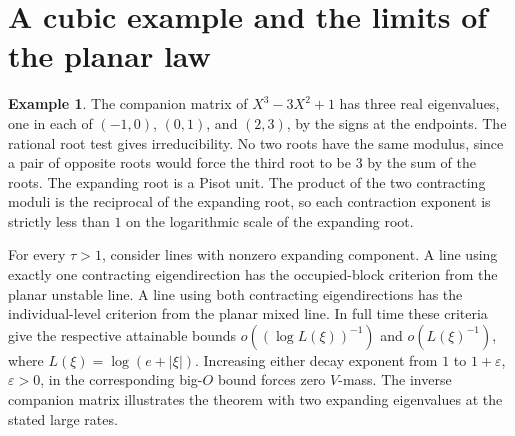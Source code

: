 \documentclass[11pt,a4paper,reqno]{amsart}
\theoremstyle{definition}
\newtheorem{example}[theorem]{Example}
\theoremstyle{remark}
\numberwithin{equation}{section}
\begin{document}
\section{A cubic example and the limits of the planar law}
\label{sec:higher}

\begin{example}
The companion matrix of \(X^3-3X^2+1\) has three real eigenvalues, one in each of \((-1,0)\), \((0,1)\), and \((2,3)\), by the signs at the endpoints. The rational root test gives irreducibility. No two roots have the same modulus, since a pair of opposite roots would force the third root to be \(3\) by the sum of the roots. The expanding root is a Pisot unit. The product of the two contracting moduli is the reciprocal of the expanding root, so each contraction exponent is strictly less than \(1\) on the logarithmic scale of the expanding root.

For every \(\tau>1\), consider lines with nonzero expanding component. A line using exactly one contracting eigendirection has the occupied-block criterion from the planar unstable line. A line using both contracting eigendirections has the individual-level criterion from the planar mixed line. In full time these criteria give the respective attainable bounds \(o((\log L(\xi))^{-1})\) and \(o(L(\xi)^{-1})\), where \(L(\xi)=\log(e+|\xi|)\). Increasing either decay exponent from \(1\) to \(1+\varepsilon\), \(\varepsilon>0\), in the corresponding big-\(O\) bound forces zero \(V\)-mass. The inverse companion matrix illustrates the theorem with two expanding eigenvalues at the stated large rates.
\end{example}
\end{document}
